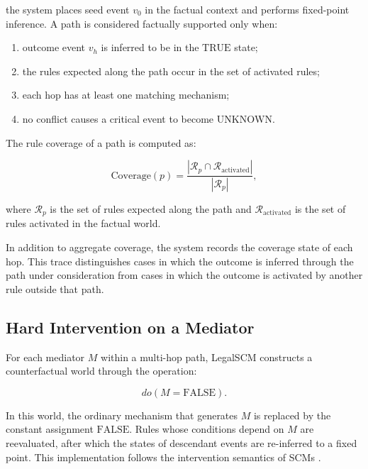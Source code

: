 the system places seed event \(v_0\) in the factual context and performs
fixed-point inference. A path is considered factually supported only when:

\begin{enumerate}
    \item outcome event \(v_h\) is inferred to be in the
    \(\mathrm{TRUE}\) state;

    \item the rules expected along the path occur in the set of activated
    rules;

    \item each hop has at least one matching mechanism;

    \item no conflict causes a critical event to become
    \(\mathrm{UNKNOWN}\).
\end{enumerate}

The rule coverage of a path is computed as:

\begin{equation}
\mathrm{Coverage}(p)
=
\frac{
    \left|
        \mathcal{R}_{p}
        \cap
        \mathcal{R}_{\mathrm{activated}}
    \right|
}{
    \left|
        \mathcal{R}_{p}
    \right|
},
\end{equation}

where \(\mathcal{R}_{p}\) is the set of rules expected along the path and
\(\mathcal{R}_{\mathrm{activated}}\) is the set of rules activated in the
factual world.

In addition to aggregate coverage, the system records the coverage state of
each hop. This trace distinguishes cases in which the outcome is inferred
through the path under consideration from cases in which the outcome is
activated by another rule outside that path.

\subsection{Hard Intervention on a Mediator}

For each mediator \(M\) within a multi-hop path, LegalSCM constructs a
counterfactual world through the operation:

\[
do
\left(
    M=\mathrm{FALSE}
\right).
\]

In this world, the ordinary mechanism that generates \(M\) is replaced by
the constant assignment \(\mathrm{FALSE}\). Rules whose conditions depend on
\(M\) are reevaluated, after which the states of descendant events are
re-inferred to a fixed point. This implementation follows the intervention
semantics of SCMs \cite{pearl2009causality}.


